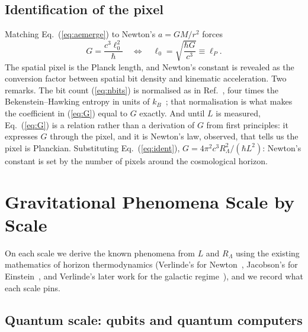 \documentclass[aps,prd,twocolumn,superscriptaddress,nofootinbib,showkeys]{revtex4-2}
\begin{document}
\subsection{Identification of the pixel}
Matching Eq.~(\ref{eq:aemerge}) to Newton's $a = GM/r^2$ forces
\begin{equation}
G = \frac{c^3\ell_0^2}{\hbar}
\quad\Longleftrightarrow\quad
\ell_0 = \sqrt{\frac{\hbar G}{c^3}} \equiv \ell_P .
\label{eq:G}
\end{equation}
The spatial pixel is the Planck length, and Newton's constant is revealed as the conversion factor between spatial bit density and kinematic acceleration. Two remarks. The bit count (\ref{eq:nbits}) is normalised as in Ref.~\cite{verlinde2011}, four times the Bekenstein--Hawking entropy in units of $k_B$~\cite{bekenstein1973}; that normalisation is what makes the coefficient in (\ref{eq:G}) equal to $G$ exactly. And until $L$ is measured, Eq.~(\ref{eq:G}) is a relation rather than a derivation of $G$ from first principles: it expresses $G$ through the pixel, and it is Newton's law, observed, that tells us the pixel is Planckian. Substituting Eq.~(\ref{eq:ident}), $G = 4\pi^2c^3R_\Lambda^2/(\hbar L^2)$: Newton's constant is set by the number of pixels around the cosmological horizon.

\section{Gravitational Phenomena Scale by Scale}
\label{sec:scales}

On each scale we derive the known phenomena from $L$ and $R_\Lambda$ using the existing mathematics of horizon thermodynamics (Verlinde's for Newton~\cite{verlinde2011}, Jacobson's for Einstein~\cite{jacobson1995}, and Verlinde's later work for the galactic regime~\cite{verlinde2017}), and we record what each scale pins.

\subsection{Quantum scale: qubits and quantum computers}
\end{document}
